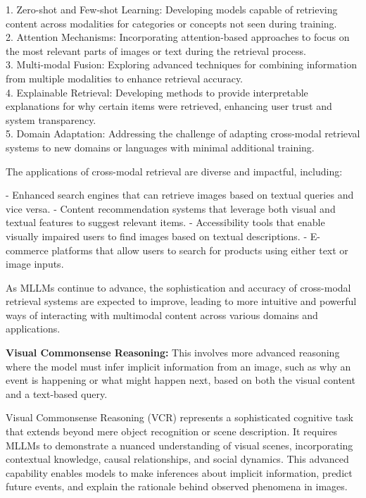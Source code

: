 1. Zero-shot and Few-shot Learning: Developing models capable of retrieving content across modalities for categories or concepts not seen during training.
\\
2. Attention Mechanisms: Incorporating attention-based approaches to focus on the most relevant parts of images or text during the retrieval process.
\\
3. Multi-modal Fusion: Exploring advanced techniques for combining information from multiple modalities to enhance retrieval accuracy.
\\
4. Explainable Retrieval: Developing methods to provide interpretable explanations for why certain items were retrieved, enhancing user trust and system transparency.
\\
5. Domain Adaptation: Addressing the challenge of adapting cross-modal retrieval systems to new domains or languages with minimal additional training.

The applications of cross-modal retrieval are diverse and impactful, including:

- Enhanced search engines that can retrieve images based on textual queries and vice versa.
- Content recommendation systems that leverage both visual and textual features to suggest relevant items.
- Accessibility tools that enable visually impaired users to find images based on textual descriptions.
- E-commerce platforms that allow users to search for products using either text or image inputs.

As MLLMs continue to advance, the sophistication and accuracy of cross-modal retrieval systems are expected to improve, leading to more intuitive and powerful ways of interacting with multimodal content across various domains and applications.


\textbf{Visual Commonsense Reasoning:} This involves more advanced reasoning where the model must infer implicit information from an image, such as why an event is happening or what might happen next, based on both the visual content and a text-based query.

Visual Commonsense Reasoning (VCR) represents a sophisticated cognitive task that extends beyond mere object recognition or scene description. It requires MLLMs to demonstrate a nuanced understanding of visual scenes, incorporating contextual knowledge, causal relationships, and social dynamics. This advanced capability enables models to make inferences about implicit information, predict future events, and explain the rationale behind observed phenomena in images.

